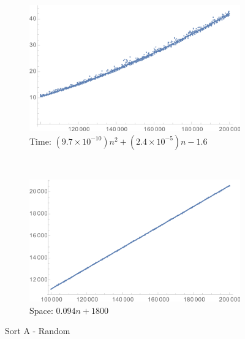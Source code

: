 \documentclass[a4paper]{scrartcl}
\begin{document}
\begin{figure}[p]
    \centering
    \begin{subfigure}[b]{0.45\textwidth}
        \includegraphics[width = \textwidth]{sortA_random_time.png}
        \caption{Time: \((9.7 \times 10^{-10}) n^2 + (2.4 \times 10^{-5}) n - 1.6\)}
    \end{subfigure}
    ~
    \begin{subfigure}[b]{0.45\textwidth}
        \includegraphics[width = \textwidth]{sortA_random_space.png}
        \caption{Space: \(0.094 n + 1800\)}
    \end{subfigure}
    \caption{Sort A - Random}
    \label{fig:sortA_random}
\end{figure}
\end{document}

